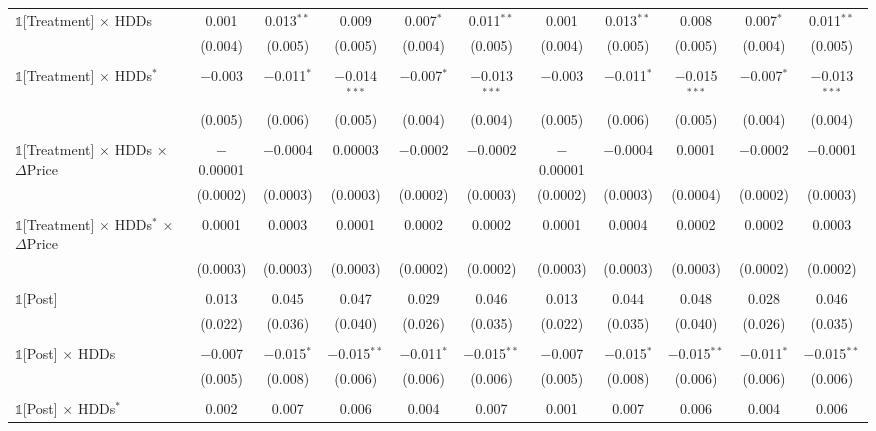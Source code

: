 \begin{table}[!htbp]
\begin{longtable}{@{\extracolsep{0pt}}lcccccccccc}
 $\mathbb{1}$[Treatment] $\times$ HDDs & 0.001 & 0.013$^{**}$ & 0.009 & 0.007$^{*}$ & 0.011$^{**}$ & 0.001 & 0.013$^{**}$ & 0.008 & 0.007$^{*}$ & 0.011$^{**}$ \\ 
  & (0.004) & (0.005) & (0.005) & (0.004) & (0.005) & (0.004) & (0.005) & (0.005) & (0.004) & (0.005) \\ 
  & & & & & & & & & & \\ 
 $\mathbb{1}$[Treatment] $\times$ HDDs$^{*}$ & $-$0.003 & $-$0.011$^{*}$ & $-$0.014$^{***}$ & $-$0.007$^{*}$ & $-$0.013$^{***}$ & $-$0.003 & $-$0.011$^{*}$ & $-$0.015$^{***}$ & $-$0.007$^{*}$ & $-$0.013$^{***}$ \\ 
  & (0.005) & (0.006) & (0.005) & (0.004) & (0.004) & (0.005) & (0.006) & (0.005) & (0.004) & (0.004) \\ 
  & & & & & & & & & & \\ 
 $\mathbb{1}$[Treatment] $\times$ HDDs $\times$ $\Delta$Price & $-$0.00001 & $-$0.0004 & 0.00003 & $-$0.0002 & $-$0.0002 & $-$0.00001 & $-$0.0004 & 0.0001 & $-$0.0002 & $-$0.0001 \\ 
  & (0.0002) & (0.0003) & (0.0003) & (0.0002) & (0.0003) & (0.0002) & (0.0003) & (0.0004) & (0.0002) & (0.0003) \\ 
  & & & & & & & & & & \\ 
 $\mathbb{1}$[Treatment] $\times$ HDDs$^{*}$ $\times$ $\Delta$Price & 0.0001 & 0.0003 & 0.0001 & 0.0002 & 0.0002 & 0.0001 & 0.0004 & 0.0002 & 0.0002 & 0.0003 \\ 
  & (0.0003) & (0.0003) & (0.0003) & (0.0002) & (0.0002) & (0.0003) & (0.0003) & (0.0003) & (0.0002) & (0.0002) \\ 
  & & & & & & & & & & \\ 
 $\mathbb{1}$[Post] & 0.013 & 0.045 & 0.047 & 0.029 & 0.046 & 0.013 & 0.044 & 0.048 & 0.028 & 0.046 \\ 
  & (0.022) & (0.036) & (0.040) & (0.026) & (0.035) & (0.022) & (0.035) & (0.040) & (0.026) & (0.035) \\ 
  & & & & & & & & & & \\ 
 $\mathbb{1}$[Post] $\times$ HDDs & $-$0.007 & $-$0.015$^{*}$ & $-$0.015$^{**}$ & $-$0.011$^{*}$ & $-$0.015$^{**}$ & $-$0.007 & $-$0.015$^{*}$ & $-$0.015$^{**}$ & $-$0.011$^{*}$ & $-$0.015$^{**}$ \\ 
  & (0.005) & (0.008) & (0.006) & (0.006) & (0.006) & (0.005) & (0.008) & (0.006) & (0.006) & (0.006) \\ 
  & & & & & & & & & & \\ 
 $\mathbb{1}$[Post] $\times$ HDDs$^{*}$ & 0.002 & 0.007 & 0.006 & 0.004 & 0.007 & 0.001 & 0.007 & 0.006 & 0.004 & 0.006 \\ 

\end{longtable}
\end{table}
